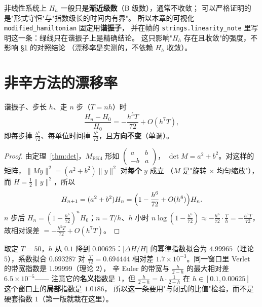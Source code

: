 \begin{remark}[非线性系统上这句话的边界]
非线性系统上 $H_h$ 一般只是\textbf{渐近级数}（B 级数），通常不收敛；
可以严格证明的是"形式守恒"与"指数级长的时间内有界"。
所以本章的可视化 \texttt{modified\_\allowbreak hamiltonian} 固定用\textbf{谐振子}，
并在帧的 \texttt{strings.linearity\_note} 里写明这一条：绿线只在谐振子上是精确结论。
这只影响"$H_h$ 存在且收敛"的强度，不影响 \S\ref{sec:drift} 的对照结论
（漂移率是实测的，不依赖 $H_h$ 收敛）。
\end{remark}

\section{非辛方法的漂移率}
\label{sec:drift}

\begin{theorem}[RK4 的能量漂移率 $h^5/72$]
\label{thm:rk4drift}
谐振子、步长 $h$、走 $n$ 步（$T=nh$）时
\begin{equation}
  \frac{H_n-H_0}{H_0}=-\frac{h^5T}{72}+O(h^7T),
\end{equation}
即每步掉 $\tfrac{h^6}{72}$、每单位时间掉 $\tfrac{h^5}{72}$，且\textbf{方向不变}（单调）。
\end{theorem}

\begin{proof}
由定理~\ref{thm:det}，$M_{\text{RK4}}$ 形如 $\begin{pmatrix}a&b\\-b&a\end{pmatrix}$，
$\det M=a^2+b^2$。对这样的矩阵，$\|M y\|^2=(a^2+b^2)\|y\|^2$ 对\textbf{每个} $y$ 成立
（$M$ 是"旋转 $\times$ 均匀缩放"），而 $H=\tfrac12\|y\|^2$，所以
\[
H_{n+1}=(a^2+b^2)H_n=\Bigl(1-\frac{h^6}{72}+O(h^8)\Bigr)H_n .
\]
$n$ 步后 $H_n=(1-\tfrac{h^6}{72})^nH_0$；$n=T/h$、$h$ 小时
$n\log(1-\tfrac{h^6}{72})\approx-\tfrac{h^6}{72}\cdot\tfrac Th=-\tfrac{h^5T}{72}$，
故相对误差 $=-\tfrac{h^5T}{72}+O(h^7T)$。
\end{proof}

\begin{remark}
取定 $T=50$，$h$ 从 $0.1$ 降到 $0.00625$：$|\Delta H/H|$ 的幂律指数拟合为
$4.99965$（理论 $5$），系数拟合 $0.693287$ 对 $\tfrac{T}{72}=0.694444$ 相对差
$1.7\times10^{-3}$。同一窗口里 Verlet 的带宽指数是 $1.99999$（理论 $2$），
辛 Euler 的带宽与 $\tfrac{h}{2-h}$ 的最大相对差 $6.5\times10^{-5}$——
注意它的\textbf{名义}指数是 $1$，但 $\tfrac{h}{2-h}=h\cdot\tfrac{1}{2-h}$ 在
$h\in[0.1,0.00625]$ 这个窗口上的\textbf{局部}指数是 $1.0186$，
所以这一条要用"与闭式的比值"检验，而不是硬套指数 $1$（第一版就栽在这里）。
\end{remark}

